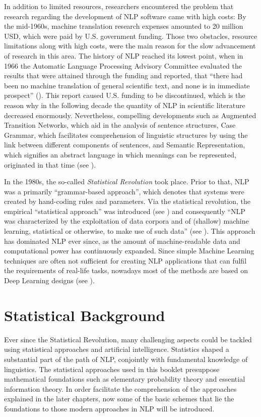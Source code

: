 \documentclass[]{krantz}
\begin{document}
In addition to limited resources, researchers encountered the problem that research regarding the development of NLP software came with high costs: By the mid-1960s, machine translation research expenses amounted to 20 million USD, which were paid by U.S. government funding. Those two obstacles, resource limitations along with high costs, were the main reason for the slow advancement of research in this area. The history of NLP reached its lowest point, when in 1966 the Automatic Language Processing Advisory Committee evaluated the results that were attained through the funding and reported, that ``there had been no machine translation of general scientific text, and none is in immediate prospect'' (\citet{alpac1966}). This report caused U.S. funding to be discontinued, which is the reason why in the following decade the quantity of NLP in scientific literature decreased enormously. Nevertheless, compelling developments such as Augmented Transition Networks, which aid in the analysis of sentence structures, Case Grammar, which facilitates comprehension of linguistic structures by using the link between different components of sentences, and Semantic Representation, which signifies an abstract language in which meanings can be represented, originated in that time (see \citet{hancox1996}).

In the 1980s, the so-called \emph{Statistical Revolution} took place. Prior to that, NLP was a primarily ``grammar-based approach'', which denotes that systems were created by hand-coding rules and parameters. Via the statistical revolution, the empirical ``statistical approach'' was introduced (see \citet{johnson2009}) and consequently ``NLP was characterized by the exploitation of data corpora and of (shallow) machine learning, statistical or otherwise, to make use of such data'' (see \citet{deng2018}). This approach has dominated NLP ever since, as the amount of machine-readable data and computational power has continuously expanded. Since simple Machine Learning techniques are often not sufficient for creating NLP applications that can fulfil the requirements of real-life tasks, nowadays most of the methods are based on Deep Learning designs (see \citet{deng2018}).

\hypertarget{statistical-background}{%
\section{Statistical Background}\label{statistical-background}}

Ever since the Statistical Revolution, many challenging aspects could be tackled using statistical approaches and artificial intelligence. Statistics shaped a substantial part of the path of NLP, conjointly with fundamental knowledge of linguistics. The statistical approaches used in this booklet presuppose mathematical foundations such as elementary probability theory and essential information theory. In order facilitate the comprehension of the approaches explained in the later chapters, now some of the basic schemes that lie the foundations to those modern approaches in NLP will be introduced.
\end{document}
